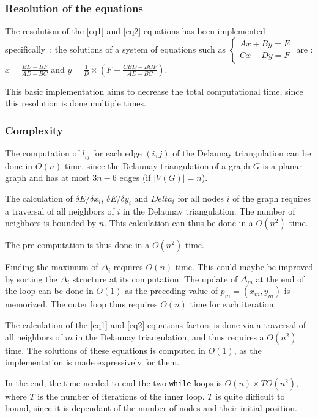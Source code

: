 \documentclass[12pt]{report}
\begin{document}
\subsubsection{Resolution of the equations}

The resolution of the \ref{eq1} and \ref{eq2} equations has been implemented specifically~: the solutions of a system of equations such as 
$\begin{cases}
Ax + By = E \\
C x + Dy = F
\end{cases}$
are : $x = \frac{ED - BF}{AD - BC}$ and $y = \frac{1}{D} \times(F - \frac{CED - BCF}{AD- BC})$.

This basic implementation aims to decrease the total computational time, since this resolution is done multiple times.

\subsubsection{Complexity}

The computation of $l_{ij}$ for each edge $(i,j)$ of the Delaunay triangulation can be done in $O(n)$ time, since the Delaunay triangulation of a graph $G$ is a planar graph and has at most $3n -6$ edges (if $|V(G)| = n$).

The calculation of  $\delta E / \delta x_i$, $\delta E / \delta y_i$ and $Delta_i$ for all nodes $i$ of the graph requires a traversal of all neighbors of $i$ in the Delaunay triangulation. The number of neighbors is bounded by $n$. This calculation can thus be done in a $O(n^2)$ time.

The pre-computation is thus done in a $O(n^2)$ time.

Finding the maximum of $\Delta_i$ requires $O(n)$ time. This could maybe be improved by sorting the $\Delta_i$ structure at its computation. The update of $\Delta_m$ at the end of the loop can be done in $O(1)$ as the preceding value of $p_m = (x_m, y_m)$ is memorized. The outer loop thus requires $O(n)$ time for each iteration.

The calculation of the \ref{eq1} and \ref{eq2} equations factors is done via a traversal of all neighbors of $m$ in the Delaunay triangulation, and thus requires a $O(n^2)$ time.
The solutions of these equations is computed in $O(1)$, as the implementation is made expressively for them.

In the end, the time needed to end the two \texttt{while} loops is $O(n) \times T O(n^2)$, where $T$ is the number of iterations of the inner loop. $T$ is quite difficult to bound, since it is dependant of the number of nodes and their initial position.
\end{document}
